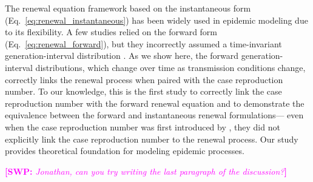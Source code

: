 \documentclass[12pt]{article}
\newcommand{\comment}{\showcomment}
\newcommand{\showcomment}[3]{\textcolor{#1}{\textbf{[#2: }\textsl{#3}\textbf{]}}}
\newcommand{\swp}[1]{\comment{magenta}{SWP}{#1}}
\newcommand{\eref}[1]{Eq.~\ref{eq:#1}}
\newcommand{\Rx}[1]{\ensuremath{{\mathcal R}_{#1}}\xspace}
\newcommand{\Ri}{\Rx{\mathrm{i}}}
\newcommand{\RR}{\ensuremath{{\mathcal R}}\xspace}
\begin{document}

The renewal equation framework based on the instantaneous form (\eref{renewal_instantaneous}) has been widely used in epidemic modeling due to its flexibility.
A few studies relied on the forward form (\eref{renewal_forward}), but they incorrectly assumed a time-invariant generation-interval distribution \citep{nishiura2007time,alvarez2020variational,white2021statistical}.
As we show here, the forward generation-interval distributions, which change over time as transmission conditions change, correctly links the renewal process when paired with the case reproduction number.
To our knowledge, this is the first study to correctly link the case reproduction number with the forward renewal equation and to demonstrate the equivalence between the forward and instantaneous renewal formulations---
even when the case reproduction number was first introduced by \cite{wallinga2004different}, they did not explicitly link the case reproduction number to the renewal process.
Our study provides theoretical foundation for modeling epidemic processes.

\swp{Jonathan, can you try writing the last paragraph of the discussion?}
\end{document}
